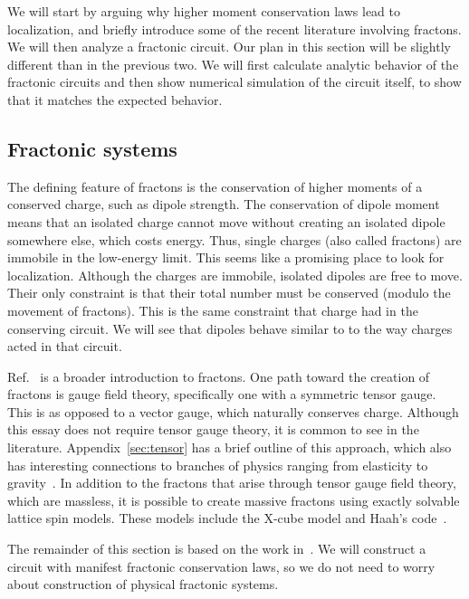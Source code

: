 \documentclass[a4paper,11pt]{article}
\begin{document}
We will start by arguing why higher moment conservation laws lead to localization, and briefly introduce some of the recent literature involving fractons. We will then analyze a fractonic circuit. Our plan in this section will be slightly different than in the previous two. We will first calculate analytic behavior of the fractonic circuits and then show numerical simulation of the circuit itself, to show that it matches the expected behavior.

\subsection{Fractonic systems} \label{sub:frac}

The defining feature of fractons is the conservation of higher moments of a conserved charge, such as dipole strength. The conservation of dipole moment means that an isolated charge cannot move without creating an isolated dipole somewhere else, which costs energy. Thus, single charges (also called fractons) are immobile in the low-energy limit. This seems like a promising place to look for localization.
Although the charges are immobile, isolated dipoles are free to move. Their only constraint is that their total number must be conserved (modulo the movement of fractons). This is the same constraint that charge had in the conserving circuit. We will see that dipoles behave similar to to the way charges acted in that circuit.

Ref.~\cite{NandkishoreFractons} is a broader introduction to fractons. One path toward the creation of fractons is gauge field theory, specifically one with a symmetric tensor gauge. This is as opposed to a vector gauge, which naturally conserves charge. Although this essay does not require tensor gauge theory, it is common to see in the literature. Appendix~\ref{sec:tensor} has a brief outline of this approach, which also has interesting connections to branches of physics ranging from elasticity to gravity~\cite{PretkoElasticity, PretkoGravity}.
In addition to the fractons that arise through tensor gauge field theory, which are massless, it is possible to create massive fractons using exactly solvable lattice spin models. These models include the X-cube model and Haah's code~\cite{CastelnovoGlass, HaahCode}.

The remainder of this section is based on the work in~\cite{PaiFracton}. We will construct a circuit with manifest fractonic conservation laws, so we do not need to worry about construction of physical fractonic systems.
\end{document}
